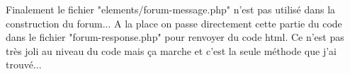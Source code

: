 \documentclass[a4paper, 11pt]{MyReport}
\begin{document}
				Finalement le fichier "elements/forum-message.php" n'est pas utilisé dans la construction du forum... A la place on passe directement cette partie du code dans le fichier "forum-response.php" pour renvoyer du code html. Ce n'est pas très joli au niveau du code mais ça marche et c'est la seule méthode que j'ai trouvé...

\end{document}
